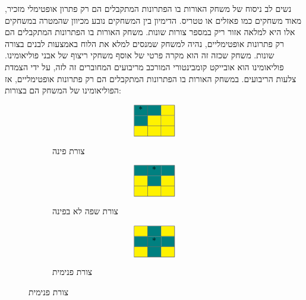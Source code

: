 \documentclass[12pt,leqno]{article}
\theoremstyle{theoremdd}
\begin{document}
נשים לב  
ניסוח של משחק האורות בו הפתרונות המתקבלים הם רק פתרון אופטימלי 
מזכיר, מאוד משחקים כמו פאזלים או טטריס.
הדימיון בין המשחקים נובע מכיוון שהמטרה במשחקים אלו היא למלאה אזור ריק במספר צורות שונות.
משחק האורות בו הפתרונות המתקבלים הם רק פתרונות אופטימליים,
נהיה למשחק 
שמנסים למלא את הלוח באמצעות לבנים בצורה שונות.
משחק שכזה זה הוא מקרה פרטי של אוסף משחקי ריצוף של אבני פוליאומינו.
פוליאומינו הוא אובייקט קומבינטורי המורכב מריבועים המחוברים זה 
לזה, על ידי הצמדת צלעות הריבועים.
במשחק האורות בו הפתרונות המתקבלים הם רק פתרונות אופטימליים,
אז
הפוליאומינו 
של המשחק הם בצורות:
\begin{figure}[ht]
    \begin{subfigure}{0.3\textwidth}
        \caption*{צורת פינה}
        \[\begin{array}{|p{0.2cm}|p{0.2cm}|p{0.2cm}|}
            \hline
            \cellcolor{teal}*&\cellcolor{teal} &\cellcolor{yellow}\\
            \hline
            \cellcolor{teal}&\cellcolor{yellow} &\cellcolor{yellow} \\
            \hline
            \cellcolor{yellow}&\cellcolor{yellow} &\cellcolor{yellow} \\
            \hline
        \end{array}\]
    \end{subfigure}
    \begin{subfigure}{0.3\textwidth}
        \caption*{צורת שפה לא בפינה}
        \[\begin{array}{|p{0.2cm}|p{0.2cm}|p{0.2cm}|}
            \hline
            \cellcolor{teal}&\cellcolor{teal}* &\cellcolor{teal}\\
            \hline
            \cellcolor{yellow}&\cellcolor{teal} &\cellcolor{yellow} \\
            \hline
            \cellcolor{yellow}&\cellcolor{yellow} &\cellcolor{yellow} \\
            \hline
        \end{array}\]
    \end{subfigure}
    \begin{subfigure}{0.3\textwidth}
        \caption*{צורת פנימית}
        \[\begin{array}{|p{0.2cm}|p{0.2cm}|p{0.2cm}|}
            \hline
            \cellcolor{yellow}&\cellcolor{teal} &\cellcolor{yellow}\\
            \hline
            \cellcolor{teal}&\cellcolor{teal}* &\cellcolor{teal} \\
            \hline
            \cellcolor{yellow}&\cellcolor{teal} &\cellcolor{yellow} \\
            \hline
        \end{array}\]
    \end{subfigure}
\end{figure}
\end{document}
